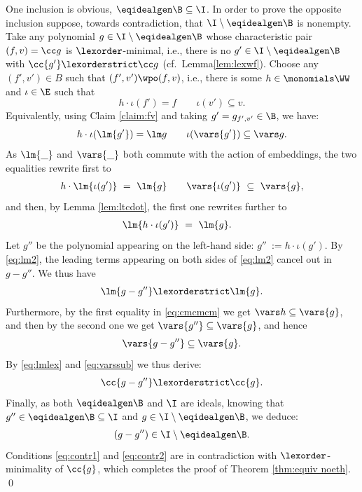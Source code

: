 One inclusion is obvious, $\eqidealgen \B \subseteq \I$.
In order to prove the opposite inclusion suppose, towards contradiction, that
$\I \setminus \eqidealgen \B$ is nonempty.
Take any polynomial $g\in \I \setminus \eqidealgen \B$ whose characteristic pair
$(f,v) = \cc g$ is $\lexorder$-minimal, i.e., there is no $g' \in \I\setminus \eqidealgen \B$
with $\cc {g'} \lexorderstrict \cc g$ (cf.~Lemma\ref{lem:lexwf}).
Choose any $(f', v')\in B$ such that 
$(f', v')\wpo (f,v)$, i.e., there is some $h\in\monomials \WW$ and $\iota\in\E$ such that
\[
h\cdot\iota(f') = f \qquad
\iota(v')\subseteq v.
\]
Equivalently, using Claim \ref{claim:fv} and 
taking $g' = g_{f',v'}\in\B$, we have:
\[
h\cdot \iota(\lm {g'}) = \lm g \qquad
\iota(\vars {g'})\subseteq \vars g.
\]
As $\lm{\_}$ and $\vars{\_}$ both commute with the action of embeddings,
the two equalities %
rewrite first to
%
\begin{align} \label{eq:cmcmcm}
h \cdot \lm{\iota(g')} \ = \ \lm{g} \qquad
\vars {\iota(g')} \ \subseteq \ \vars{g},
\end{align}
%
and then,
by Lemma \ref{lem:ltcdot}, the first one rewrites further to
\begin{align} 
\label{eq:lm2}
\lm{h \cdot \iota(g')} \ & = \ \lm{g}.
\end{align}
Let $g''$ be the polynomial appearing on the left-hand side:
$
g'' \ :=  h \cdot \iota(g').
$
By \eqref{eq:lm2}, the leading terms appearing on both sides of
\eqref{eq:lm2} cancel out in $g - g''$.
We thus have
\begin{align} \label{eq:lmlex}
\lm {g - g''} \lexorderstrict \lm{g}.
\end{align}
Furthermore, by the first equality in \eqref{eq:cmcmcm} we get $\vars h \subseteq \vars {g}$,
and then by the second one we
get $\vars {g''} \subseteq \vars{g}$, and hence
\begin{align} \label{eq:varssub}
\vars {g - g''} \subseteq \vars{g}.
\end{align}
By \eqref{eq:lmlex} and \eqref{eq:varssub} we thus derive:
\begin{align} \label{eq:contr1}
\cc {g - g''} \lexorderstrict \cc{g}.
\end{align}
%
Finally, as both $\eqidealgen \B$ and $\I$ are ideals,
knowing that $g'' \in \eqidealgen \B\subseteq \I$ and $g \in \I\setminus \eqidealgen \B$,
we deduce:
\begin{align} \label{eq:contr2}
(g - g'') \in \I\setminus \eqidealgen \B.
\end{align}
Conditions
\eqref{eq:contr1} and \eqref{eq:contr2} are in contradiction with $\lexorder$-minimality of $\cc{g}$,
which completes the proof
of Theorem \ref{thm:equiv noeth}.
\qed

